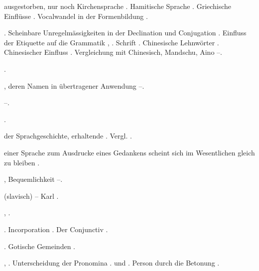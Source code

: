 \begin{register}
 ausgestorben, nur noch Kirchensprache \pageref{sp.147}. Hamitische Sprache \pageref{sp.160}\sed{, \pageref{sp.282}}. Griechische Einflüsse \pageref{sp.272}.  Vocalwandel in der Formenbildung \pageref{sp.354}. 


. Scheinbare Unregelmässigkeiten in der Declination und Conjugation \pageref{sp.87}. Einfluss der Etiquette auf die Grammatik \pageref{sp.95}, \pageref{sp.246}.  Schrift \pageref{sp.129}.  Chinesische Lehnwörter \pageref{sp.266}.  Chinesischer Einfluss \pageref{sp.271}. Vergleichung mit Chinesisch, Mandschu, Aino \pageref{sp.290}–\pageref{sp.291}. 

 \pageref{sp.147}.

, deren Namen in übertragener Anwendung \pageref{sp.40}–\pageref{sp.41}.

 \pageref{sp.277}–\pageref{sp.278}.

 \pageref{sp.383}.

 der Sprachgeschichte, erhaltende \pageref{sp.46}. Vergl. .

 einer Sprache zum Ausdrucke eines Gedankens scheint sich im Wesentlichen gleich zu bleiben \pageref{sp.243}.

, Bequemlichkeit \pageref{sp.182}–\pageref{sp.185}.

 (slavisch) – Karl \pageref{sp.230}.

,  \pageref{sp.265}.

 \pageref{sp.163}.  Incorporation \pageref{sp.358}. Der Conjunctiv \pageref{sp.359}. 

. Gotische Gemeinden \pageref{sp.146}.


 \pageref{sp.150}, \pageref{sp.282}. Unterscheidung der Pronomina \pageref{sp.1}. und \pageref{sp.2}. Person durch die Betonung \pageref{sp.379}.


\end{register}
